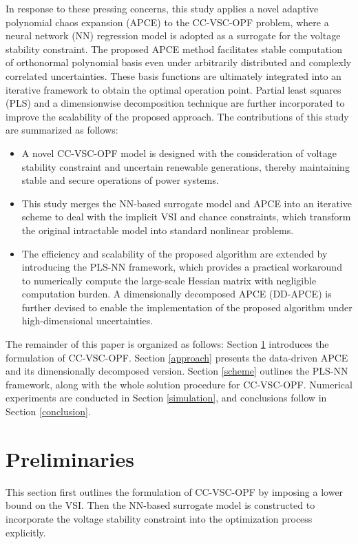 \documentclass[journal]{IEEEtran}
\theoremstyle{definition}
\theoremstyle{remark}
\begin{document}
In response to these pressing concerns, this study applies a novel adaptive polynomial chaos expansion (APCE) \cite{lee2020practical} to the CC-VSC-OPF problem, where a neural network (NN) regression model is adopted as a surrogate for the voltage stability constraint. The proposed APCE method facilitates stable computation of orthonormal polynomial basis even under arbitrarily distributed and complexly correlated uncertainties. These basis functions are ultimately integrated into an iterative framework to obtain the optimal operation point. Partial least squares (PLS) and a dimensionwise decomposition technique are further incorporated to improve the scalability of the proposed approach. The contributions of this study are summarized as follows:
\begin{itemize}
\item A novel CC-VSC-OPF model is designed with the consideration of voltage stability constraint and uncertain renewable generations, thereby maintaining stable and secure operations of power systems. 
\item This study merges the NN-based surrogate model and APCE into an iterative scheme to deal with the implicit VSI and chance constraints, which transform the original intractable model into standard nonlinear problems.
\item The efficiency and scalability of the proposed algorithm are extended by introducing the PLS-NN framework, which provides a practical workaround to numerically compute the large-scale Hessian matrix with negligible computation burden. A dimensionally decomposed APCE (DD-APCE) is further devised to enable the implementation of the proposed algorithm under high-dimensional uncertainties. 
\end{itemize}
The remainder of this paper is organized as follows: Section \ref{preliminary} introduces the formulation of CC-VSC-OPF. Section \ref{approach} presents the data-driven APCE and its dimensionally decomposed version. Section \ref{scheme} outlines the PLS-NN framework, along with the whole solution procedure for CC-VSC-OPF. Numerical experiments are conducted in Section \ref{simulation}, and conclusions follow in Section \ref{conclusion}.
\section{Preliminaries}\label{preliminary}
This section first outlines the formulation of CC-VSC-OPF by imposing a lower bound on the VSI. Then the NN-based surrogate model is constructed to incorporate the voltage stability constraint into the optimization process explicitly.  
\vspace{5pt}
\end{document}
